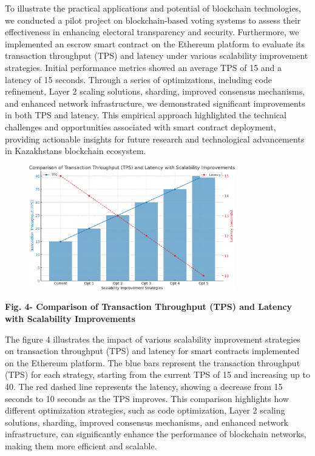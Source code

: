 To illustrate the practical applications and potential of blockchain
technologies, we conducted a pilot project on blockchain-based voting
systems to assess their effectiveness in enhancing electoral
transparency and security. Furthermore, we implemented an escrow smart
contract on the Ethereum platform to evaluate its transaction throughput
(TPS) and latency under various scalability improvement strategies.
Initial performance metrics showed an average TPS of 15 and a latency of
15 seconds. Through a series of optimizations, including code
refinement, Layer 2 scaling solutions, sharding, improved consensus
mechanisms, and enhanced network infrastructure, we demonstrated
significant improvements in both TPS and latency. This empirical
approach highlighted the technical challenges and opportunities
associated with smart contract deployment, providing actionable insights
for future research and technological advancements in
Kazakhstan\textquotesingle s blockchain ecosystem.

\begin{figure}[H]
	\centering
	\includegraphics[width=0.8\textwidth]{assets/81}
	\caption*{}
\end{figure}

\textbf{Fig. 4- Comparison of Transaction Throughput (TPS) and Latency
with Scalability Improvements}

The figure 4 illustrates the impact of various scalability improvement
strategies on transaction throughput (TPS) and latency for smart
contracts implemented on the Ethereum platform. The blue bars represent
the transaction throughput (TPS) for each strategy, starting from the
current TPS of 15 and increasing up to 40. The red dashed line
represents the latency, showing a decrease from 15 seconds to 10 seconds
as the TPS improves. This comparison highlights how different
optimization strategies, such as code optimization, Layer 2 scaling
solutions, sharding, improved consensus mechanisms, and enhanced network
infrastructure, can significantly enhance the performance of blockchain
networks, making them more efficient and scalable.

